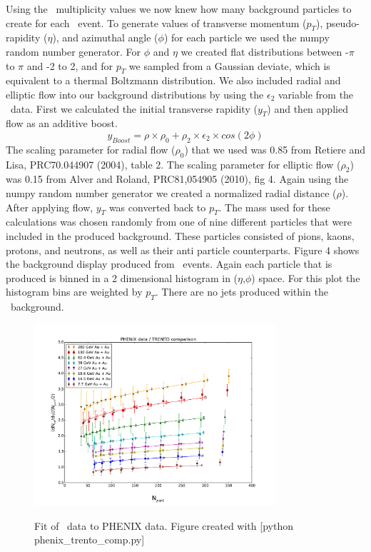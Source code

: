 \documentclass[11pt]{article}
\begin{document}
Using the \trento\ multiplicity values we now knew how many background particles to create for each \trento\ event. To generate values of transverse momentum ($p_T$), pseudo-rapidity ($\eta$), and azimuthal angle ($\phi$) for each particle we used the numpy random number generator. For $\phi$  and $\eta$ we created flat distributions between -$\pi$ to $\pi$ and -2 to 2, and for $p_T$ we sampled from a Gaussian deviate, which is equivalent to a thermal Boltzmann distribution. We also included radial and elliptic flow into our background distributions by using the $\epsilon_2$ variable from the \trento\ data. First we calculated the initial transverse rapidity ($y_T$) and then applied flow as an additive boost. 
\[y_{Boost} = \rho \times \rho_0 + \rho_2 \times \epsilon_2 \times cos(2\phi)\]
The scaling parameter for radial flow ($\rho_0$) that we used was 0.85 from Retiere and Lisa, PRC70.044907 (2004), table 2.  The scaling parameter for elliptic flow ($\rho_2$) was 0.15 from Alver and Roland, PRC81,054905 (2010), fig 4. Again using the numpy random number generator we created a normalized radial distance ($\rho$). After applying flow, $y_T$ was converted back to $p_T$. The mass used for these calculations was chosen randomly from one of nine different particles that were included in the produced background. These particles consisted of pions, kaons, protons, and neutrons, as well as their anti particle counterparts. Figure 4 shows the background display produced from \trento\ events. Again each particle that is produced is binned in a 2 dimensional histogram in ($\eta$,$\phi$) space. For this plot the histogram bins are weighted by $p_T$. There are no jets produced within the \trento\ background.

\begin{figure}[h]
\begin{center}
\includegraphics[width=0.8\textwidth]{phenix_trento_comp.pdf}
\label{fig_label}
\caption{Fit of \trento\ data to PHENIX data. Figure created with [python phenix\_trento\_comp.py]}
\end{center}
\end{figure}
\end{document}
